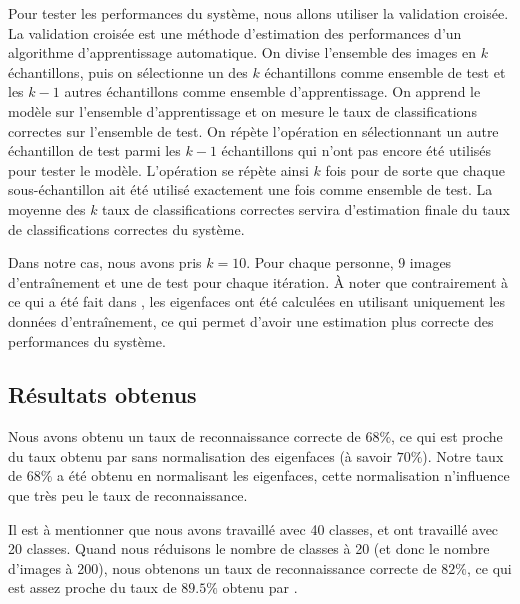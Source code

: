 Pour tester les performances du système, nous allons utiliser la validation croisée.
La validation croisée est une méthode d’estimation des performances d'un algorithme
d'apprentissage automatique. On divise l'ensemble des images en $k$ échantillons, 
puis on sélectionne un des $k$ échantillons comme ensemble de test et les $k-1$ autres
échantillons comme ensemble d'apprentissage. On apprend le modèle sur
l'ensemble d'apprentissage et on mesure le taux de classifications correctes sur l'ensemble
de test. On répète l'opération en sélectionnant un autre échantillon de test parmi les $k-1$
échantillons qui n'ont pas encore été utilisés pour tester le modèle. 
L'opération se répète ainsi $k$ fois pour de sorte que chaque sous-échantillon ait été utilisé exactement
une fois comme ensemble de test. La moyenne des $k$ taux de classifications correctes servira
d'estimation finale du taux de classifications correctes du système.

Dans notre cas, nous avons pris $k = 10$. Pour chaque personne,
9 images d'entraînement et une de test pour chaque itération.
À noter que contrairement à ce qui a été fait dans \cite{article},
les eigenfaces ont été calculées en utilisant uniquement les données
d'entraînement, ce qui permet d'avoir une estimation plus correcte 
des performances du système.


\subsection{Résultats obtenus}
Nous avons obtenu un taux de reconnaissance correcte de $68\%$, ce qui est proche
du taux obtenu par \cite{article} sans normalisation des eigenfaces (à savoir $70\%$).
Notre taux de $68\%$ a été obtenu en normalisant les eigenfaces, cette normalisation
n'influence que très peu le taux de reconnaissance.

Il est à mentionner que nous avons travaillé avec 40 classes, et \cite{article}
ont travaillé avec 20 classes. Quand nous réduisons le nombre de classes à 20
(et donc le nombre d'images à 200), nous obtenons un taux de reconnaissance
correcte de $82\%$, ce qui est assez proche du taux de $89.5\%$ obtenu par \cite{article}.